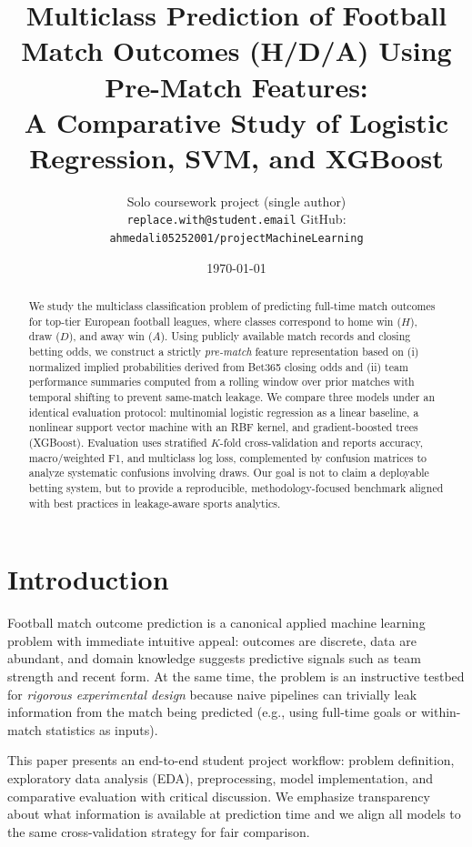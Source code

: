 \documentclass[11pt,a4paper]{article}
\title{Multiclass Prediction of Football Match Outcomes (H/D/A) Using Pre-Match Features:\\
A Comparative Study of Logistic Regression, SVM, and XGBoost}
\author{
  Solo coursework project (single author)\\
  \texttt{replace.with@student.email} \quad GitHub: \texttt{ahmedali05252001/projectMachineLearning}
}
\date{\today}
\begin{document}
\maketitle

\begin{abstract}
We study the multiclass classification problem of predicting full-time match outcomes for top-tier European football leagues, where classes correspond to home win (\(H\)), draw (\(D\)), and away win (\(A\)). Using publicly available match records and closing betting odds, we construct a strictly \emph{pre-match} feature representation based on (i) normalized implied probabilities derived from Bet365 closing odds and (ii) team performance summaries computed from a rolling window over prior matches with temporal shifting to prevent same-match leakage. We compare three models under an identical evaluation protocol: multinomial logistic regression as a linear baseline, a nonlinear support vector machine with an RBF kernel, and gradient-boosted trees (XGBoost). Evaluation uses stratified \(K\)-fold cross-validation and reports accuracy, macro/weighted F1, and multiclass log loss, complemented by confusion matrices to analyze systematic confusions involving draws. Our goal is not to claim a deployable betting system, but to provide a reproducible, methodology-focused benchmark aligned with best practices in leakage-aware sports analytics.
\end{abstract}

\section{Introduction}
Football match outcome prediction is a canonical applied machine learning problem with immediate intuitive appeal: outcomes are discrete, data are abundant, and domain knowledge suggests predictive signals such as team strength and recent form. At the same time, the problem is an instructive testbed for \emph{rigorous experimental design} because naive pipelines can trivially leak information from the match being predicted (e.g., using full-time goals or within-match statistics as inputs).

This paper presents an end-to-end student project workflow: problem definition, exploratory data analysis (EDA), preprocessing, model implementation, and comparative evaluation with critical discussion. We emphasize transparency about what information is available at prediction time and we align all models to the same cross-validation strategy for fair comparison.
\end{document}
